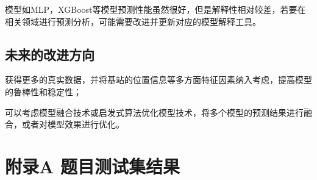 \documentclass[bwprint]{gmcmthesis}
\begin{document}
模型如MLP，XGBoost等模型预测性能虽然很好，但是解释性相对较差，若要在相关领域进行预测分析，可能需要改进并更新对应的模型解释工具。

\subsection{未来的改进方向}

获得更多的真实数据，并将基站的位置信息等多方面特征因素纳入考虑，提高模型的鲁棒性和稳定性；

可以考虑模型融合技术或启发式算法优化模型技术，将多个模型的预测结果进行融合，或者对模型效果进行优化。









\section{附录A 题目测试集结果}
\end{document}
